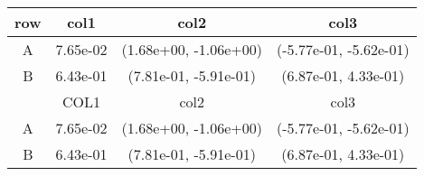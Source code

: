 \begin{tabular}{cccc}
\toprule
row&col1&col2&col3\tabularnewline
\midrule
A&7.65e-02& (1.68e+00, -1.06e+00)& (-5.77e-01, -5.62e-01)\tabularnewline
B&6.43e-01& (7.81e-01, -5.91e-01)& (6.87e-01, 4.33e-01)\tabularnewline
\midrule
&COL1&col2&col3\tabularnewline
\midrule
A&7.65e-02& (1.68e+00, -1.06e+00)& (-5.77e-01, -5.62e-01)\tabularnewline
B&6.43e-01& (7.81e-01, -5.91e-01)& (6.87e-01, 4.33e-01)\tabularnewline
\bottomrule
\end{tabular}
